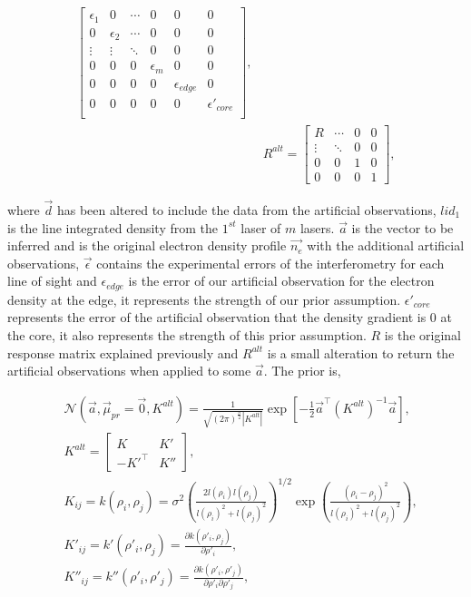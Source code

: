 \begin{equation}
\begin{aligned}
\begin{bmatrix}
\epsilon_1 & 0 & \cdots & 0 & 0 & 0\\
0 & \epsilon_2 & \cdots & 0 & 0 & 0\\
\vdots & \vdots & \ddots & 0 & 0 & 0\\
0 & 0 & 0 &\epsilon_m & 0 & 0\\
0 & 0 & 0 & 0 & \epsilon_{edge} & 0\\
0 & 0 & 0 & 0 & 0 & \epsilon'_{core}\\
\end{bmatrix},\\
&R^{alt} =\begin{bmatrix}
R & \cdots & 0 & 0\\
\vdots & \ddots & 0 & 0\\
0 & 0 & 1 & 0 \\
0 & 0 & 0 & 1
\end{bmatrix},
\end{aligned}
\end{equation}

\noindent where $\vec d$ has been altered to include the data from the artificial observations, $lid_1$ is the line integrated density from the $1^{st}$ laser of $m$ lasers. $\vec a$ is the vector to be inferred and is the original electron density profile $\vec{n_e}$ with the additional artificial observations, $\vec \epsilon$ contains the experimental errors of the interferometry for each line of sight and $\epsilon_{edge}$ is the error of our artificial observation for the electron density at the edge, it represents the strength of our prior assumption. $\epsilon'_{core}$ represents the error of the artificial observation that the density gradient is 0 at the core, it also represents the strength of this prior assumption. $R$ is the original response matrix explained previously and $R^{alt}$ is a small alteration to return the artificial observations when applied to some $\vec a$. The prior is,

\begin{equation}
\begin{aligned}
&\mathcal{N}(\vec{a}, \vec \mu_{pr} = \vec{0}, K^{alt}) = \frac{1}{\sqrt{(2\pi)^{\frac{n}{2}}|K^{alt}|}} \exp \left[{{-\frac{1}{2}\vec{a}^\top (K^{alt})^{-1}\vec{a}}}\right],\\
&K^{alt} = \begin{bmatrix} K & K'\\ -K'^\top & K''\end{bmatrix},\\
&K_{ij} = k(\rho_i, \rho_j) = \sigma^2 \left( \frac{2l(\rho_i)l(\rho_j)}{l(\rho_i)^2 + l(\rho_j)^2} \right)^{1/2} \exp\left({\frac{(\rho_i - \rho_j)^2}{l(\rho_i)^2+l(\rho_j)^2}}\right),\\
&K'_{ij} = k'(\rho'_i, \rho_j) = \frac{\partial k{(\rho'_i,\rho_j)}}{\partial \rho'_i},\\
&K''_{ij} = k''(\rho'_i, \rho'_j) = \frac{\partial k{(\rho'_i,\rho'_j)}}{\partial \rho'_i\partial \rho'_j},\\
\end{aligned}
\end{equation}

